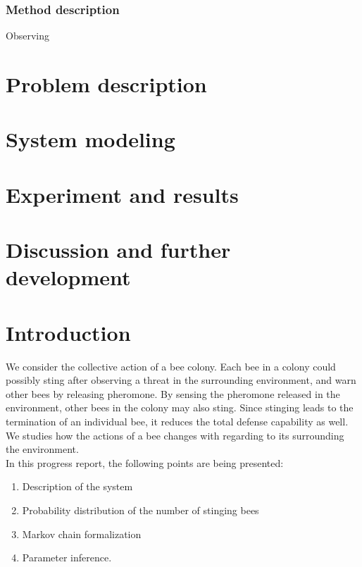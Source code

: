 \documentclass[12pt]{article}
\begin{document}
\subsubsection{Method description}
Observing






\section{Problem description}

\section{System modeling}

\section{Experiment and results}

\section{Discussion and further development}



\section{Introduction}
We consider the collective action of a bee colony. Each bee in a colony could
possibly sting after observing a threat in the surrounding environment, and warn
other bees by releasing pheromone. By sensing the pheromone released in the
environment, other bees in the colony may also sting. Since stinging leads to
the termination of an individual bee, it reduces the total defense capability as
well. We studies how the actions of a bee changes with regarding to its
surrounding the environment.\\
In this progress report, the following points are being presented:
\begin{enumerate}
\item Description of the system
\item Probability distribution of the number of stinging bees
\item Markov chain formalization
\item Parameter inference.
\end{enumerate}
\end{document}
